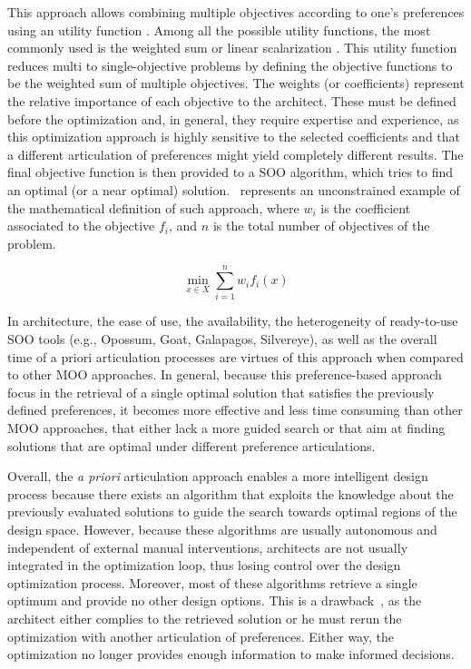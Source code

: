 	This approach allows combining multiple objectives according to one’s preferences using an utility function \cite{Marler2004}. Among all the possible utility functions, the most commonly used is the weighted sum or linear scalarization \cite{Wortmann2017Opossum}. This utility function reduces multi to single-objective problems by defining the objective functions to be the weighted sum of multiple objectives. The weights (or coefficients) represent the relative importance of each objective to the architect. These must be defined before the optimization and, in general, they require expertise and experience, as this optimization approach is highly sensitive to the selected coefficients and that a different articulation of preferences might yield completely different results. The
final objective function is then provided to a \ac{SOO} algorithm, which tries to find an optimal (or a near optimal) solution.~ represents an unconstrained example of the mathematical definition of such approach, where $w_i$ is the coefficient associated to the objective $f_i$, and $n$ is the total number of objectives of the problem. 

    \begin{equation} \label{eq:scalarization}
    	\min_{x \in X} \sum_{i=1}^n w_i f_i(x)
    \end{equation}

	In architecture, the ease of use, the availability,
the heterogeneity of ready-to-use \ac{SOO} tools (e.g., Opossum, Goat, Galapagos, Silvereye), as well as the overall time of a priori articulation processes are virtues of this approach when compared to other \ac{MOO} approaches. In general, because this preference-based approach focus in the retrieval of a single optimal solution that satisfies the previously defined preferences, it becomes more effective and less time consuming than other \ac{MOO} approaches, that either lack a more guided search or that aim at finding solutions that are optimal under different preference articulations. 

	Overall, the \textit{a priori} articulation approach enables a more intelligent design process because there exists an algorithm that exploits the knowledge about the previously evaluated solutions to guide the search towards optimal regions of the design space. However, because these algorithms are usually autonomous and independent of external manual interventions, architects are not usually integrated in the optimization loop, thus losing control over the design optimization process. Moreover, most of these algorithms retrieve a single optimum and provide no other design options. This is a drawback~\cite{Cichocka2017SURVEY}, as the architect either complies to the retrieved solution or he must rerun the optimization with another articulation of preferences. Either way, the optimization no longer provides enough information to make informed decisions.

